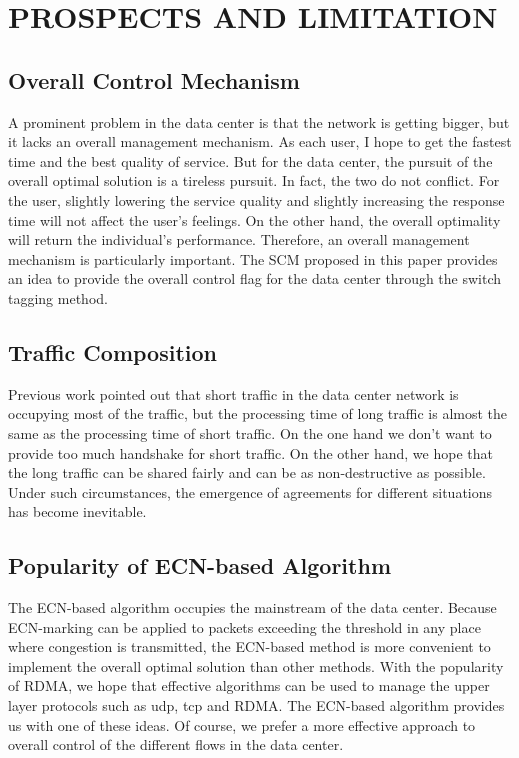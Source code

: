 \documentclass[conference]{IEEEtran}
\begin{document}
\section{PROSPECTS AND LIMITATION}
\subsection{Overall Control Mechanism} A prominent problem in the data center is that the network is getting bigger, but it lacks an overall management mechanism. As each user, I hope to get the fastest time and the best quality of service. But for the data center, the pursuit of the overall optimal solution is a tireless pursuit. In fact, the two do not conflict. For the user, slightly lowering the service quality and slightly increasing the response time will not affect the user's feelings. On the other hand, the overall optimality will return the individual's performance. Therefore, an overall management mechanism is particularly important. The SCM proposed in this paper provides an idea to provide the overall control flag for the data center through the switch tagging method.
\subsection{Traffic Composition} Previous work pointed out that short traffic in the data center network is occupying most of the traffic\cite{}, but the processing time of long traffic is almost the same as the processing time of short traffic. On the one hand we don't want to provide too much handshake for short traffic. On the other hand, we hope that the long traffic can be shared fairly and can be as non-destructive as possible. Under such circumstances, the emergence of agreements for different situations has become inevitable.
\subsection{Popularity of ECN-based Algorithm} The ECN-based algorithm occupies the mainstream of the data center. Because ECN-marking can be applied to packets exceeding the threshold in any place where congestion is transmitted, the ECN-based method is more convenient to implement the overall optimal solution than other methods. With the popularity of RDMA\cite{}, we hope that effective algorithms can be used to manage the upper layer protocols such as udp, tcp and RDMA. The ECN-based algorithm provides us with one of these ideas. Of course, we prefer a more effective approach to overall control of the different flows in the data center.
\end{document}
